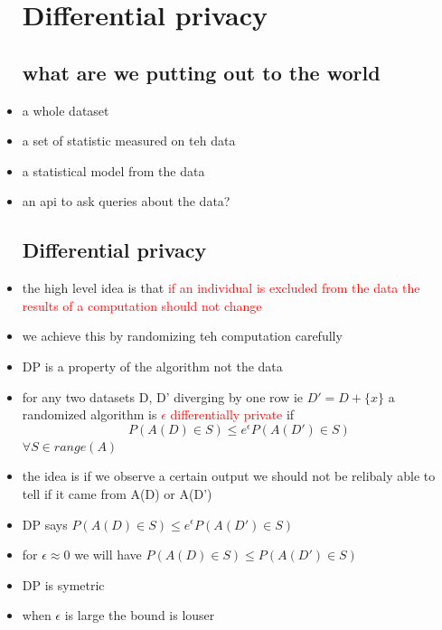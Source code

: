 \documentclass{article}
\begin{document}
\begin{itemize}
\section*{Differential privacy}
\subsection*{what are we putting out to the world }
\item a whole dataset
\item a set of statistic measured on teh data 
\item a statistical model from the data 
\item an api to ask queries about the data? 
\subsection*{Differential privacy}
\item the high level idea is that \textcolor{red}{if an individual is excluded from the data the results of a computation should not change }
\item we achieve this by randomizing teh computation carefully 
\item DP is a property of the algorithm not the data 
\item for any two datasets D, D' diverging by one row ie $D'=D+\{x\}$
 a randomized algorithm is \textcolor{red}{$\epsilon$ differentially private } if $$P(A(D)\in S)\leq e^{\epsilon} P(A(D')\in S)$$ $\forall S\in range(A)$
\item the idea is if we observe a certain output we should not be relibaly able to tell if it came from A(D) or A(D')
\item DP says $P(A(D)\in S)\leq e^{\epsilon}P(A(D')\in S) $
\item for $\epsilon\approx 0$ we will have $P(A(D)\in S)\leq P(A(D')\in S)$
\item DP is symetric 
\item when $\epsilon$ is large the bound is louser 

\end{itemize}
\end{document}
